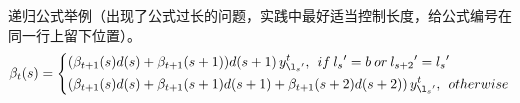递归公式举例（出现了公式过长的问题，实践中最好适当控制长度，给公式编号在同一行上留下位置）。
\begin{equation}
\beta_t(s)=\left\{
\begin{aligned}
& (\beta_{t+1}(s) d(s)+\beta_{t+1}(s+1))d(s+1)\,  y_{\l_s{}'}^t, \: \: if \:  l_s{}'=b \:  or \:  l_{s+2}{}'=l_s{}'\\
& (\beta_{t+1}(s) d(s)+\beta_{t+1}(s+1)d(s+1)+\beta_{t+1}(s+2)d(s+2))\,  y_{\l_s{}'}^t,\: \:   otherwise
\end{aligned}
\right.
\end{equation}
